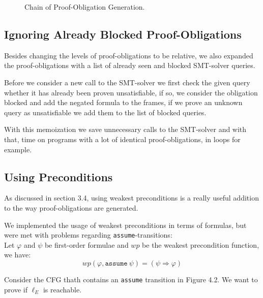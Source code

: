\documentclass[11pt, a4paper, BCOR=10mm, ngerman]{scrbook}
\begin{document}
\begin{figure}[H]
\centering
\resizebox{\textwidth}{!}{}
\caption{Chain of Proof-Obligation Generation.}
\label{fig:the_nice_figure}
\end{figure}
 

\subsection{Ignoring Already Blocked Proof-Obligations}
Besides changing the levels of proof-obligations to be relative, we also expanded the proof-obligations with a list of already seen and blocked SMT-solver queries. \par Before we consider a new call to the SMT-solver we first check the given query whether it has already been proven unsatisfiable, if so, we consider the obligation blocked and add the negated formula to the frames, if we prove an unknown query as unsatisfiable we add them to the list of blocked queries. \par
With this memoization we save unnecessary calls to the SMT-solver and with that, time on programs with a lot of identical proof-obligations, in loops for example.

\subsection{Using Preconditions}
As discussed in section 3.4, using weakest preconditions is a really useful addition to the way proof-obligations are generated. \par
We implemented the usage of weakest preconditions in terms of formulas, but were met with problems regarding \texttt{assume}-transitions: \\
Let $\varphi$ and $\psi$ be first-order formulae and $wp$ be the weakest precondition function, we have: 
\begin{equation*}
	wp(\varphi, \texttt{assume}\ \psi) = (\psi \Rightarrow \varphi)
\end{equation*}

Consider the CFG thath contains an \texttt{assume} transition in Figure 4.2. We want to prove if $\ell_E$ is reachable. \\
\end{document}
